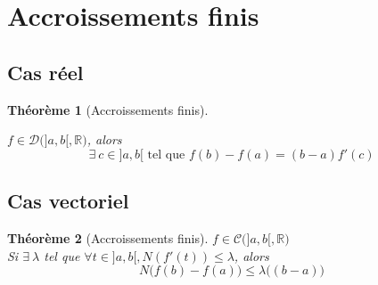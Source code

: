 \documentclass[11pt,a4paper]{report}
\newtheorem{theorem}{Théorème}[chapter]
\newtheorem{itheorem}[theorem]{Théorème}
\theoremstyle{definition}
\begin{document}
\section{Accroissements finis}
\subsection{Cas réel} %
\begin{theorem}[Accroissements finis]
\label{thm:accroissements_finis}
\begin{minipage}{0.6\textwidth}
$f \in \mathcal{D}\big( ]a,b[,\ensuremath{\mathbb{R}} \big)$, alors 
\begin{equation}
\exists \: c \in ]a,b[ \text{ tel que }\boxed{f(b) - f(a) = (b-a) f'(c)}
\end{equation}
\end{minipage}\hspace{1cm}
\begin{minipage}{0.3\textwidth}
\end{minipage}
\end{theorem}
\subsection{Cas vectoriel}
\begin{itheorem}[Accroissements finis]
\begin{minipage}{0.6\textwidth}
$f \in \mathcal{C}\big( ]a,b[,\ensuremath{\mathbb{R}} \big)$\\ 
Si $\exists \: \lambda$ tel que $ \forall t\in ]a,b[, N(f'(t))\leq \lambda$, alors
    \begin{equation}
        \boxed{N\big(  f(b) - f(a)\big)  \leq \lambda \big( (b-a)\big)}
    \end{equation}
\end{minipage}\hspace{1cm}
\begin{minipage}{0.3\textwidth}
\end{minipage}
\end{itheorem}

\end{document}
